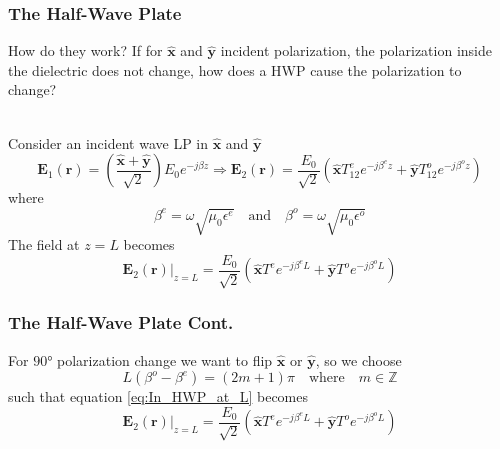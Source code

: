 \documentclass[aspectratio=169,t,xcolor=table]{beamer}
\newcommand{\bv}[1]{\mathbf{#1}}
\newcommand{\vecc}[1]{\mathbf{#1}}
\begin{document}
\begin{frame}
\frametitle{The Half-Wave Plate}
\begin{alertblock}{How do they work?}
    If for $\bv{\hat{x}}$ and $\bv{\hat{y}}$ incident polarization, the 
    polarization inside the dielectric does 
    not change, how does a HWP cause the polarization to change?
\end{alertblock}\\\vspace{1em}
Consider an incident wave LP in $\bv{\hat{x}}$ and $\bv{\hat{y}}$ \cite{Wav_anis}
\begin{equation}\label{eq:In_HWP}
    \vecc{E}_1(\vecc{r}) = 
    \left(\frac{\bv{\hat{x}} + \bv{\hat{y}}}{\sqrt{2}}\right)E_0 e^{-j\beta z}
    \Rightarrow
    \vecc{E}_2(\vecc{r}) = 
    \frac{E_0}{\sqrt{2}}\left(
        \bv{\hat{x}}T_{12}^{e} e^{-j\beta^e z} +
        \bv{\hat{y}}T_{12}^{o} e^{-j\beta^o z}
    \right)
\end{equation}
where 
\begin{equation}
\beta^e = \omega\sqrt{\mu_0\epsilon^e}
\quad\text{and}\quad
\beta^o = \omega\sqrt{\mu_0\epsilon^o}
\end{equation}
The field at $z=L$ becomes
\begin{equation}\label{eq:In_HWP_at_L}
    \left.\vecc{E}_2(\vecc{r}) \right|_{z = L}= 
    \frac{E_0}{\sqrt{2}}\left(
        \bv{\hat{x}}T^{e} e^{-j\beta^e L} +
        \bv{\hat{y}}T^{o} e^{-j\beta^o L}
    \right)
\end{equation}
\end{frame}

\begin{frame}
    \frametitle{The Half-Wave Plate Cont.} 
    For $\ang{90}$ polarization change we want to flip $\bv{\hat{x}}$ or 
    $\bv{\hat{y}}$, so we choose
    \begin{equation}\label{eq:L_HWP}
        L(\beta^o-\beta^e) = (2m+1)\pi
        \quad\mathrm{where}\quad
        m \in \mathbb{Z}
    \end{equation}
    such that equation \ref{eq:In_HWP_at_L} becomes \cite{Wav_anis}
    \begin{equation}\label{eq:Func_HWP}
        \left.\vecc{E}_2(\vecc{r}) \right|_{z = L}= 
        \frac{E_0}{\sqrt{2}}\left(
            \bv{\hat{x}}T^{e} e^{-j\beta^e L} +
            \bv{\hat{y}}T^{o} e^{-j\beta^o L}
        \right)
    \end{equation} 

    \end{frame}
\end{document}
